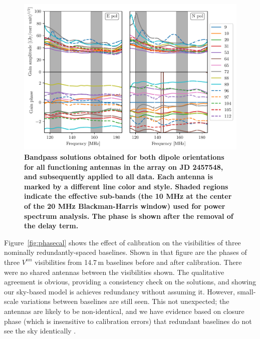 \documentclass[twocolumn, trackchanges]{aastex61}
\newcommand{\edited}[1]{{\bf \color{blue} #1}}
\begin{document}
{\begin{figure}
\centering
\includegraphics[scale=0.5]{gains.pdf}
\caption{\edited{Bandpass solutions obtained for both dipole orientations for all functioning antennas in the array on JD 2457548, and subsequently applied to all data.  Each antenna is marked by a different line color and style. Shaded regions indicate the effective sub-bands (the 10 MHz at the center of the 20 MHz Blackman-Harris window) used for power spectrum analysis.  The phase is shown after the removal of the delay term.}}
\label{fig:bandpass} 
\end{figure}

Figure~\ref{fig:phasecal} shows the effect of calibration on the visibilities of three nominally redundantly-spaced baselines.  Shown in that figure are the phases of three $V^{nn}$ visibilities from 14.7\,m baselines before and after calibration. There were no shared antennas between the visibilities shown. The qualitative agreement is obvious, providing a consistency check on the solutions, and showing our sky-based model is achieves redundancy without assuming it.  However, small-scale variations between baselines are still seen.  This not unexpected; the antennas are likely to be non-identical, and we have evidence based on closure phase (which is insensitive to calibration errors) that redundant baselines do not see the sky identically \citep{carilli18}.   

}
\end{document}
